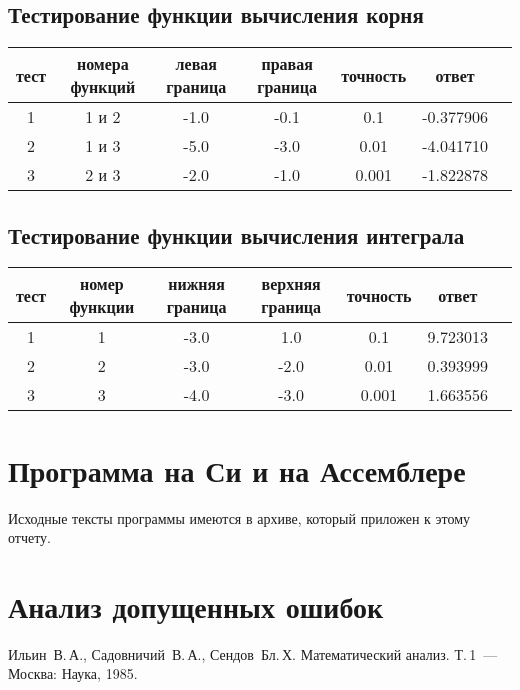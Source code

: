 \documentclass[a4paper,12pt,titlepage,finall]{article}
\begin{document}
\subsection{Тестирование функции вычисления корня}
\begin{table}[h]
\centering
\begin{tabular}{|c|c|c|c|c|c|c|}
    \hline
     тест & номера функций & левая граница & правая граница & точность & ответ \\
    \hline
     1 & 1 и 2 & -1.0 & -0.1 & 0.1 & -0.377906 \\
    \hline
     2 & 1 и 3 & -5.0 & -3.0 & 0.01 & -4.041710 \\
    \hline
     3 & 2 и 3 & -2.0 & -1.0 & 0.001 & -1.822878 \\
    \hline
\end{tabular}
\end{table}
\clearpage

\subsection{Тестирование функции вычисления интеграла}

\begin{table}[h]
\centering
\begin{tabular}{|c|c|c|c|c|c|c|}
    \hline
    тест & номер функции & нижняя граница & верхняя граница & точность & ответ \\
    \hline
     1 & 1 & -3.0 & 1.0 & 0.1  & 9.723013 \\
    \hline
     2 & 2 & -3.0 & -2.0 & 0.01  & 0.393999 \\
    \hline
     3 & 3 & -4.0 & -3.0 & 0.001  & 1.663556 \\
    \hline
\end{tabular}
\end{table}
\clearpage

\newpage

\section{Программа на Си и на Ассемблере}

Исходные тексты программы имеются в архиве, который приложен к этому отчету.

\newpage

\section{Анализ допущенных ошибок}

\newpage
\begin{raggedright}
\begin{thebibliography}{99}
 Ильин~В.\,А., Садовничий~В.\,А., Сендов~Бл.\,Х. Математический анализ. Т.\,1~---
    Москва: Наука, 1985.
\end{thebibliography}
\end{raggedright}
\end{document}
